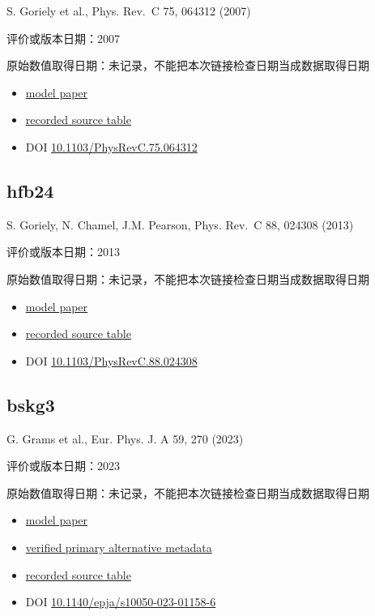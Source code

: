 \documentclass[
  11pt,
  letterpaper,
]{article}
\providecommand{\tightlist}{%
  \setlength{\itemsep}{0pt}\setlength{\parskip}{0pt}}
\begin{document}
S. Goriely et al., Phys. Rev.~C 75, 064312 (2007)

评价或版本日期：2007

原始数值取得日期：未记录，不能把本次链接检查日期当成数据取得日期

\begin{itemize}
\tightlist
\item
  \href{https://doi.org/10.1103/PhysRevC.75.064312}{model paper}
\item
  \href{https://www.astro.ulb.ac.be/Nucdata/Masses/hfb14-plain}{recorded
  source table}
\item
  DOI
  \href{https://doi.org/10.1103/PhysRevC.75.064312}{10.1103/PhysRevC.75.064312}
\end{itemize}

\subsection{hfb24}\label{hfb24}

S. Goriely, N. Chamel, J.M. Pearson, Phys. Rev.~C 88, 024308 (2013)

评价或版本日期：2013

原始数值取得日期：未记录，不能把本次链接检查日期当成数据取得日期

\begin{itemize}
\tightlist
\item
  \href{https://doi.org/10.1103/PhysRevC.88.024308}{model paper}
\item
  \href{https://www.astro.ulb.ac.be/bruslib/nucdata/hfb24-dat}{recorded
  source table}
\item
  DOI
  \href{https://doi.org/10.1103/PhysRevC.88.024308}{10.1103/PhysRevC.88.024308}
\end{itemize}

\subsection{bskg3}\label{bskg3}

G. Grams et al., Eur. Phys. J. A 59, 270 (2023)

评价或版本日期：2023

原始数值取得日期：未记录，不能把本次链接检查日期当成数据取得日期

\begin{itemize}
\tightlist
\item
  \href{https://doi.org/10.1140/epja/s10050-023-01158-6}{model paper}
\item
  \href{https://arxiv.org/abs/2307.14276}{verified primary alternative
  metadata}
\item
  \href{https://www.astro.ulb.ac.be/bruslib/nucdata/bskg03-dat}{recorded
  source table}
\item
  DOI
  \href{https://doi.org/10.1140/epja/s10050-023-01158-6}{10.1140/epja/s10050-023-01158-6}
\end{itemize}
\end{document}
